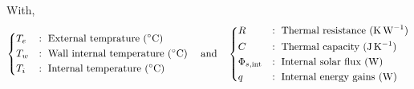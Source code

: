 \documentclass[11pt]{article}
\begin{document}
        \noindent
        With,
        $$
        \begin{dcases}
          T_e&:\text{ External temprature (\SI{}{\celsius})} \\
          T_w&:\text{ Wall internal temperature (\SI{}{\celsius})} \\
          T_i&:\text{ Internal temperature (\SI{}{\celsius})} \\
        \end{dcases}\quad\text{and}\quad
        \begin{dcases}
          R&:\text{ Thermal resistance (\SI{}{\kelvin\per\watt})} \\
          C&:\text{ Thermal capacity (\SI{}{\joule\per\kelvin})} \\
          \Phi_{s,\mathrm{int}}&:\text{ Internal solar flux (\SI{}{\watt})} \\
          q&:\text{ Internal energy gains (\SI{}{\watt})} \\
        \end{dcases}
        $$
\end{document}

